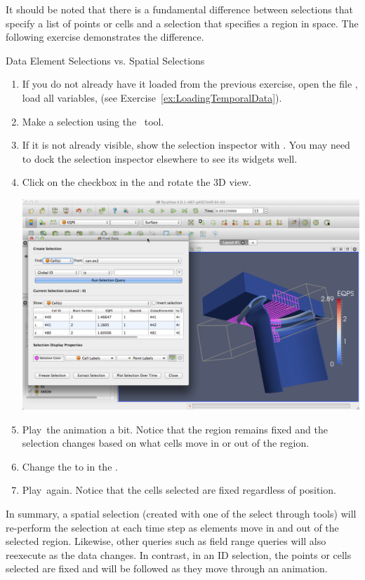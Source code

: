 It should be noted that there is a fundamental difference between
selections that specify a list of points or cells and a selection that
specifies a region in space.  The following exercise demonstrates the
difference.

\begin{exercise}{Data Element Selections vs. Spatial Selections}
  \label{ex:DataElementSelectionsVsSpatialSelections}%
  \begin{enumerate}
  \item If you do not already have it loaded from the previous exercise,
    open the file , load all variables, \apply (see
    Exercise~\ref{ex:LoadingTemporalData}).
  \item Make a selection using the ~\selectCellsThrough tool.
  \item If it is not already visible, show the selection inspector
    with  \ra {}.  You may need to dock
    the selection inspector elsewhere to see its widgets well.
  \item Click on the  checkbox in the  and rotate the 3D view.

    \begin{inlinefig}
      \includegraphics[width=\scw]{images/SelectionFrustum}
    \end{inlinefig}

  \item Play~\vcrPlay the animation a bit.  Notice that the region remains
    fixed and the selection changes based on what cells move in or out of
    the region.
  \item Change the  to  in the .
  \item Play~\vcrPlay again.  Notice that the cells selected are fixed
    regardless of position.
  \end{enumerate}

  In summary, a spatial selection (created with one of the select through
  tools) will re-perform the selection at each time step as elements move
  in and out of the selected region.  Likewise, other queries such as field
  range queries will also reexecute as the data changes.  In contrast, in
  an ID selection, the points or cells selected are fixed and will be
  followed as they move through an animation.
\end{exercise}

